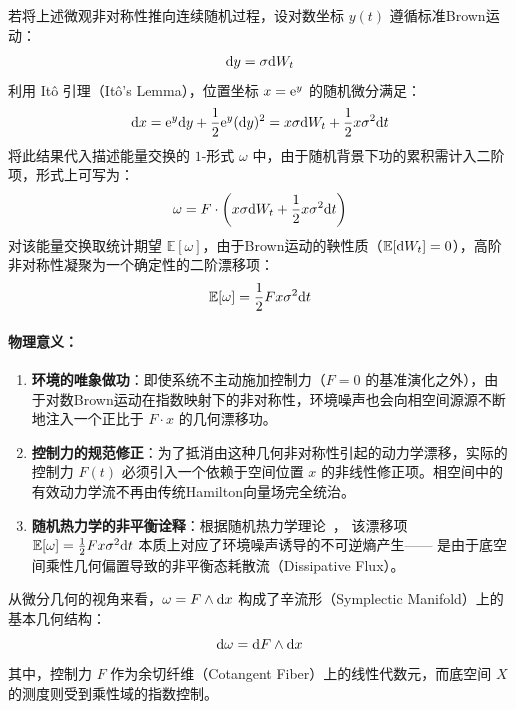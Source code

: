 ﻿\documentclass[10pt,a4paper]{article}
\begin{document}
若将上述微观非对称性推向连续随机过程，设对数坐标 $y(t)$ 遵循标准Brown运动：
\begin{equation}
\text dy = \sigma \text dW_t
\end{equation}
利用 It\^{o} 引理（It\^{o}'s Lemma），位置坐标 $x = \text e^y$ 的随机微分满足：
\begin{equation}
\text dx = \text e^y \text dy + \frac{1}{2}\text e^y (\text dy)^2 = x \sigma \text dW_t + \frac{1}{2}x \sigma^2 \text dt
\end{equation}
将此结果代入描述能量交换的 $1$-形式 $\omega$ 中，由于随机背景下功的累积需计入二阶项，形式上可写为：
\begin{equation}
\omega = F \cdot \left( x \sigma \text dW_t + \frac{1}{2}x \sigma^2 \text dt \right)
\end{equation}
对该能量交换取统计期望 $\mathbb E[\omega]$，由于Brown运动的鞅性质（$\mathbb E[\text dW_t] = 0$），高阶非对称性凝聚为一个确定性的二阶漂移项：
\begin{equation}
\mathbb E[\omega] = \frac{1}{2} F x \sigma^2 \text dt
\end{equation}

\paragraph{物理意义：}
\begin{enumerate}
    \item \textbf{环境的唯象做功}：即使系统不主动施加控制力（$F=0$ 的基准演化之外），由于对数Brown运动在指数映射下的非对称性，环境噪声也会向相空间源源不断地注入一个正比于 $F \cdot x$ 的几何漂移功。
    \item \textbf{控制力的规范修正}：为了抵消由这种几何非对称性引起的动力学漂移，实际的控制力 $F(t)$ 必须引入一个依赖于空间位置 $x$ 的非线性修正项。相空间中的有效动力学流不再由传统Hamilton向量场完全统治。
    \item \textbf{随机热力学的非平衡诠释}：根据随机热力学理论~\cite{Seifert2012}，
    该漂移项 $\mathbb E[\omega] = \frac{1}{2}Fx\sigma^2\text dt$
    本质上对应了环境噪声诱导的不可逆熵产生——
    是由于底空间乘性几何偏置导致的非平衡态耗散流（Dissipative Flux）。
\end{enumerate}

从微分几何的视角来看，$\omega = F \wedge \text dx$ 构成了辛流形（Symplectic Manifold）上的基本几何结构：
\begin{equation}
\text d\omega = \text dF \wedge \text dx
\end{equation}
其中，控制力 $F$ 作为余切纤维（Cotangent Fiber）上的线性代数元，而底空间 $X$ 的测度则受到乘性域的指数控制。
\end{document}
